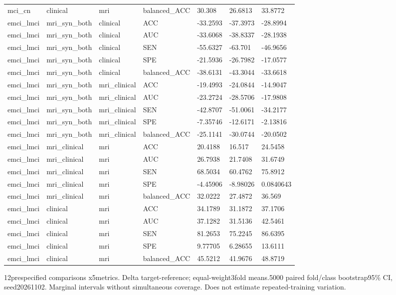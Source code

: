 \documentclass{article}
\begin{document}
\begin{landscape}
\begin{longtable}{lllllll}
mci\_cn & clinical & mri & balanced\_ACC & 30.308 & 26.6813 & 33.8772 \\
emci\_lmci & mri\_syn\_both & clinical & ACC & -33.2593 & -37.3973 & -28.8994 \\
emci\_lmci & mri\_syn\_both & clinical & AUC & -33.6068 & -38.8337 & -28.1938 \\
emci\_lmci & mri\_syn\_both & clinical & SEN & -55.6327 & -63.701 & -46.9656 \\
emci\_lmci & mri\_syn\_both & clinical & SPE & -21.5936 & -26.7982 & -17.0577 \\
emci\_lmci & mri\_syn\_both & clinical & balanced\_ACC & -38.6131 & -43.3044 & -33.6618 \\
emci\_lmci & mri\_syn\_both & mri\_clinical & ACC & -19.4993 & -24.0844 & -14.9047 \\
emci\_lmci & mri\_syn\_both & mri\_clinical & AUC & -23.2724 & -28.5706 & -17.9808 \\
emci\_lmci & mri\_syn\_both & mri\_clinical & SEN & -42.8707 & -51.0061 & -34.2177 \\
emci\_lmci & mri\_syn\_both & mri\_clinical & SPE & -7.35746 & -12.6171 & -2.13816 \\
emci\_lmci & mri\_syn\_both & mri\_clinical & balanced\_ACC & -25.1141 & -30.0744 & -20.0502 \\
emci\_lmci & mri\_clinical & mri & ACC & 20.4188 & 16.517 & 24.5458 \\
emci\_lmci & mri\_clinical & mri & AUC & 26.7938 & 21.7408 & 31.6749 \\
emci\_lmci & mri\_clinical & mri & SEN & 68.5034 & 60.4762 & 75.8912 \\
emci\_lmci & mri\_clinical & mri & SPE & -4.45906 & -8.98026 & 0.0840643 \\
emci\_lmci & mri\_clinical & mri & balanced\_ACC & 32.0222 & 27.4872 & 36.569 \\
emci\_lmci & clinical & mri & ACC & 34.1789 & 31.1872 & 37.1706 \\
emci\_lmci & clinical & mri & AUC & 37.1282 & 31.5136 & 42.5461 \\
emci\_lmci & clinical & mri & SEN & 81.2653 & 75.2245 & 86.6395 \\
emci\_lmci & clinical & mri & SPE & 9.77705 & 6.28655 & 13.6111 \\
emci\_lmci & clinical & mri & balanced\_ACC & 45.5212 & 41.9676 & 48.8719 \\
\end{longtable}
\noindent\parbox{\linewidth}{\footnotesize 12prespecified comparisons x5metrics. Delta target-reference; equal-weight3fold means.5000 paired fold/class bootstrap95\% CI, seed20261102. Marginal intervals without simultaneous coverage. Does not estimate repeated-training variation.}
\endgroup
\end{landscape}
\end{document}
